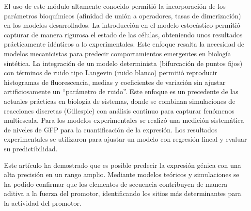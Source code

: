 \documentclass[nochap]{config/ejercicios}
\begin{document}
El uso de este módulo altamente conocido permitió la incorporación de los parámetros bioquímicos (afinidad de unión a operadores, tasas de dimerización) en los modelos desarrollados. La introducción en el modelo estocástico permitió capturar de manera rigurosa el estado de las células, obteniendo unos resultados prácticamente idénticos a lo experimentales. Este enfoque resalta la necesidad de modelos mecanicistas para predecir comportamientos emergentes en biología sintética.
La integración de un modelo determinista (bifurcación de puntos fijos) con términos de ruido tipo Langevin (ruido blanco) permitió reproducir histogramas de fluorescencia, medias y coeficientes de variación sin ajustar artificiosamente un “parámetro de ruido”. Este enfoque es un precedente de las actuales prácticas en biología de sistemas, donde se combinan simulaciones de reacciones discretas (Gillespie) con análisis continuo para capturar fenómenos multiescala. Para los modelos experimentales se realizó una medición sistemática de niveles de GFP para la cuantificación de la expresión. Los resultados experimentales se utilizaron para ajustar un modelo con regresión lineal y evaluar su predictibilidad. 


Este artículo ha demostrado que es posible predecir la expresión génica con una alta precisión en un rango amplio. Mediante modelos teóricos y simulaciones se ha podido confirmar que los elementos de secuencia contribuyen de manera aditiva a la fuerza del promotor, identificando los sitios más determinantes para la actividad del promotor.


\end{document}

